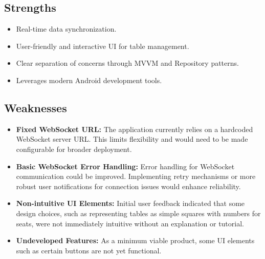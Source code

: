 \documentclass{article}
\begin{document}
\subsection{Strengths}
\begin{itemize}
    \item Real-time data synchronization.
    \item User-friendly and interactive UI for table management.
    \item Clear separation of concerns through MVVM and Repository patterns.
    \item Leverages modern Android development tools.
\end{itemize}

\subsection{Weaknesses}
\begin{itemize}
    \item \textbf{Fixed WebSocket URL:} The application currently relies on a hardcoded WebSocket server URL. This limits flexibility and would need to be made configurable for broader deployment.

    \item \textbf{Basic WebSocket Error Handling:} Error handling for WebSocket communication could be improved. Implementing retry mechanisms or more robust user notifications for connection issues would enhance reliability.
    
    \item \textbf{Non-intuitive UI Elements:} Initial user feedback indicated that some design choices, such as representing tables as simple squares with numbers for seats, were not immediately intuitive without an explanation or tutorial.
    
    \item \textbf{Undeveloped Features:} As a minimum viable product, some UI elements such as certain buttons are not yet functional.
\end{itemize}
\end{document}

